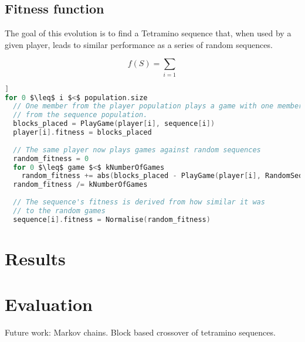 \documentclass[a4paper,11pt]{article}
\begin{document}
\subsection{Fitness function}

The goal of this evolution is to find a Tetramino sequence that, when used by
a given player, leads to similar performance as a series of random sequences.

\begin {equation}
  f(S) = \sum_{i=1}
\end {equation}


\begin{lstlisting}[firstnumber=1,language=c,morekeywords={until,foreach,in},frame=single,mathescape=true,caption={Pseudo-code of the algorithm used to evolve one generation},label={psuedocode},float=[htb]]
for 0 $\leq$ i $<$ population.size
  // One member from the player population plays a game with one member
  // from the sequence population.
  blocks_placed = PlayGame(player[i], sequence[i])
  player[i].fitness = blocks_placed
  
  // The same player now plays games against random sequences
  random_fitness = 0
  for 0 $\leq$ game $<$ kNumberOfGames
    random_fitness += abs(blocks_placed - PlayGame(player[i], RandomSequence()))
  random_fitness /= kNumberOfGames
  
  // The sequence's fitness is derived from how similar it was
  // to the random games
  sequence[i].fitness = Normalise(random_fitness)
\end{lstlisting}

\section{Results}

\section{Evaluation}

Future work:
Markov chains.
Block based crossover of tetramino sequences.


\end{document}
